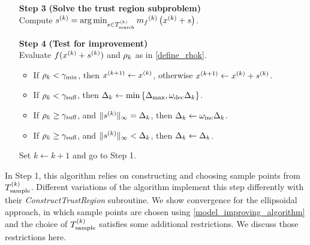 \begin{algorithm}[h]
\begin{itemize}
        
        \item[\textbf{Step 3}] \textbf{(Solve the trust region subproblem)} \\
            Compute ${{s}^{(k)}} = \operatorname*{arg\,min}_{s \in {T_{\text{search}}^{(k)}}} {{m}_f}^{(k)}\left(x^{(k)} + s\right)$. 
            
 		\end{itemize}
 		\end{algorithm}
 		
 		\newpage
 		
 		\begin{algorithm}[H]
 		\begin{itemize}
        \item[\textbf{Step 4}] \textbf{(Test for improvement)} \\
            Evaluate $f(x^{(k)} + {{s}^{(k)}})$ and $\rho_k$ as in \cref{define_rhok}.
            \begin{itemize}
            	\item If $\rho_k < \gamma_{\textrm{min}}$, then ${{x}^{(k+1)}} \gets x^{(k)}$, otherwise ${{x}^{(k+1)}} \gets x^{(k)} + {{s}^{(k)}}$.
            	\item If $\rho_k < \gamma_{\textrm{suff}}$, then $\Delta_k \gets \min\left\{{\Delta_{\textrm{max}}}, \omega_{\text{dec}}\Delta_k\right\}$.
            	\item If $\rho_k \ge \gamma_{\textrm{suff}}$, and $\|{{s}^{(k)}}\|_{\infty} = \Delta_k$, then $\Delta_k \gets \omega_{\text{inc}}\Delta_k$.
            	\item If $\rho_k \ge \gamma_{\textrm{suff}}$, and $\|{{s}^{(k)}}\|_{\infty} < \Delta_k$, then $\Delta_k \gets \Delta_k$.
            \end{itemize}
            Set $k \gets k+1$ and go to Step 1.
    \end{itemize}
\end{algorithm}

In Step 1, this algorithm relies on constructing and choosing sample points from ${T_{\text{sample}}^{(k)}}$.
Different variations of the algorithm implement this step differently with their \emph{ConstructTrustRegion} subroutine.
We show convergence for the ellipsoidal approach, in which sample points are chosen using \cref{model_improving_algorithm}
and the choice of ${T_{\text{sample}}^{(k)}}$ satisfies some additional restrictions.
We discuss those restrictions here.

